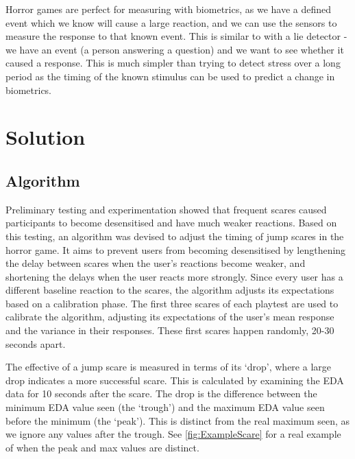 \documentclass[12pt,a4paper]{article}\usepackage[]{graphicx}\usepackage[]{color}
\begin{document}
Horror games are perfect for measuring with biometrics, as we have a defined event which we know will cause a large reaction, and we can use the sensors to measure the response to that known event.
This is similar to with a lie detector - we have an event (a person answering a question) and we want to see whether it caused a response.
This is much simpler than trying to detect stress over a long period as the timing of the known stimulus can be used to predict a change in biometrics.

\section{Solution}

\subsection{Algorithm}

Preliminary testing and experimentation showed that frequent scares caused participants to become desensitised and have much weaker reactions.
Based on this testing, an algorithm was devised to adjust the timing of jump scares in the horror game.
It aims to prevent users from becoming desensitised by lengthening the delay between scares when the user's reactions become weaker, and shortening the delays when the user reacts more strongly.
Since every user has a different baseline reaction to the scares, the algorithm adjusts its expectations based on a calibration phase.
The first three scares of each playtest are used to calibrate the algorithm, adjusting its expectations of the user's mean response and the variance in their responses.
These first scares happen randomly, 20-30 seconds apart.

The effective of a jump scare is measured in terms of its `drop', where a large drop indicates a more successful scare.
This is calculated by examining the EDA data for 10 seconds after the scare.
The drop is the difference between the minimum EDA value seen (the `trough') and the maximum EDA value seen before the minimum (the `peak').
This is distinct from the real maximum seen, as we ignore any values after the trough.
See \vref{fig:ExampleScare} for a real example of when the peak and max values are distinct.
	
\end{document}
